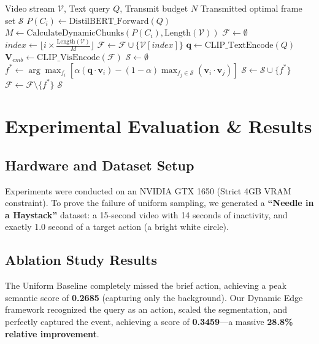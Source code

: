 \documentclass[11pt, a4paper, oneside]{report}
\begin{document}
\begin{algorithm}[H]
\caption{Semantic-Aware Edge Filtering Pipeline}
\label{alg:edge_pipeline}
\begin{algorithmic}[1]
\REQUIRE Video stream $\mathcal{V}$, Text query $Q$, Transmit budget $N$
\ENSURE Transmitted optimal frame set $\mathcal{S}$
\STATE $P(C_i) \leftarrow \text{DistilBERT\_Forward}(Q)$
\STATE $M \leftarrow \text{CalculateDynamicChunks}(P(C_i), \text{Length}(\mathcal{V}))$
\STATE $\mathcal{F} \leftarrow \emptyset$ 
    \STATE $index \leftarrow \lfloor i \times \frac{\text{Length}(\mathcal{V})}{M} \rfloor$
    \STATE $\mathcal{F} \leftarrow \mathcal{F} \cup \{\mathcal{V}[index]\}$
\ENDFOR
\STATE $\mathbf{q} \leftarrow \text{CLIP\_TextEncode}(Q)$
\STATE $\mathbf{V}_{emb} \leftarrow \text{CLIP\_VisEncode}(\mathcal{F})$
\STATE $\mathcal{S} \leftarrow \emptyset$
    \STATE $f^* \leftarrow \arg\max_{f_i} [ \alpha (\mathbf{q} \cdot \mathbf{v}_i) - (1-\alpha) \max_{f_j \in \mathcal{S}} (\mathbf{v}_i \cdot \mathbf{v}_j) ]$
    \STATE $\mathcal{S} \leftarrow \mathcal{S} \cup \{f^*\}$
    \STATE $\mathcal{F} \leftarrow \mathcal{F} \setminus \{f^*\}$
\ENDWHILE
\RETURN $\mathcal{S}$
\end{algorithmic}
\end{algorithm}

\chapter{Experimental Evaluation \& Results}

\section{Hardware and Dataset Setup}
Experiments were conducted on an NVIDIA GTX 1650 (Strict 4GB VRAM constraint). To prove the failure of uniform sampling, we generated a \textbf{``Needle in a Haystack''} dataset: a 15-second video with 14 seconds of inactivity, and exactly 1.0 second of a target action (a bright white circle).

\section{Ablation Study Results}

\begin{highlightbox}
The Uniform Baseline completely missed the brief action, achieving a peak semantic score of \textbf{0.2685} (capturing only the background). Our Dynamic Edge framework recognized the query as an action, scaled the segmentation, and perfectly captured the event, achieving a score of \textbf{0.3459}---a massive \textbf{28.8\% relative improvement}.
\end{highlightbox}
\end{document}
